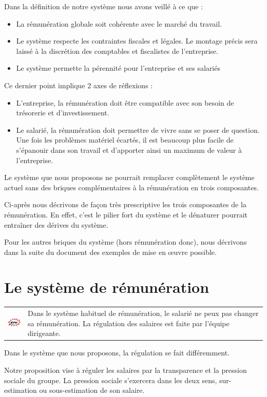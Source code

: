 \documentclass[12pt]{article}
\newcommand{\actuel}[1]{%
  \begin{tcolorbox}[colframe=DarkButter,boxrule=2pt,arc=4pt,left=6pt,right=6pt,top=6pt,bottom=6pt,boxsep=0pt,colback=Aluminium1]
    \begin{tabular}{m{1.5cm} m{11cm}}
      \includegraphics[width=1.5cm]{includes/now} & #1 \\
    \end{tabular}
  \end{tcolorbox}
}
\begin{document}
 Dans la définition de notre système nous avons veillé à ce que :
 \begin{itemize}
   \item La rémunération globale soit cohérente avec le marché du travail.
   \item Le système respecte les contraintes fiscales et légales. Le montage précis sera  laissé à la discrétion des comptables et fiscalistes de l’entreprise.
   \item Le système permette la pérennité pour l’entreprise et ses salariés
 \end{itemize}

 Ce dernier point implique 2 axes de réflexions :  
 \begin{itemize}
    \item L’entreprise, la rémunération doit être compatible avec son besoin de trésorerie et d’investissement.
    \item Le salarié, la rémunération doit permettre de vivre sans se poser de question. Une fois les problèmes matériel écartés, il est beaucoup plus facile de s’épanouir dans son travail et d'apporter ainsi un maximum de valeur à l’entreprise.
 \end{itemize}

 Le système que nous proposons ne pourrait remplacer complètement le système actuel sans des briques complémentaires à la rémunération en trois composantes. 

 Ci-après nous décrivons de façon très prescriptive les trois composantes de la rémunération. En effet, c'est le pilier fort du système et le dénaturer pourrait entraîner des dérives du système. 
 
 Pour les autres briques du système (hors rémunération donc), nous décrivons dans la suite du document des exemples de mise en œuvre possible. 

\section{Le système de rémunération}
  \actuel{Dans le système habituel de rémunération, le salarié ne peux pas changer sa rémunération. La régulation des salaires est faite par l’équipe dirigeante.}

 Dans le système que nous proposons, la régulation se fait différemment. 

 Notre proposition vise à réguler les salaires par la transparence et la pression sociale du groupe. La pression sociale s’exercera dans les deux sens, sur-estimation ou sous-estimation de son salaire. 
\end{document}
